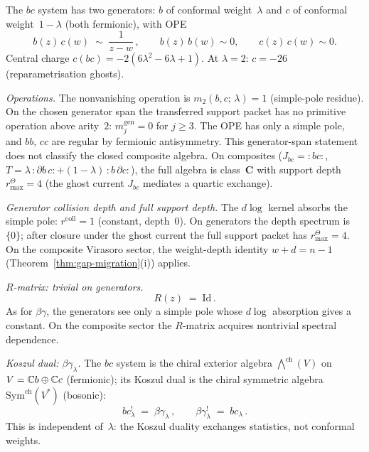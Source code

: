 \begin{computation}%
\label{comp:bc-ordered-bar}%
%
%
%
The $bc$ system has two generators: $b$ of conformal
weight~$\lambda$ and $c$ of conformal weight~$1-\lambda$
(both fermionic), with OPE
\begin{equation}\label{eq:bc-ope}
b(z)\,c(w)
\;\sim\;
\frac{1}{z-w}\,,
\qquad
b(z)\,b(w) \sim 0,
\qquad
c(z)\,c(w) \sim 0.
\end{equation}
Central charge $c(bc) = -2(6\lambda^2 - 6\lambda + 1)$.
At $\lambda = 2$: $c = -26$ (reparametrisation ghosts).

\smallskip
\noindent
\emph{Operations.}
The nonvanishing operation is
$m_2(b,c;\,\lambda) = 1$ (simple-pole residue).
On the chosen generator span the transferred support packet has no
primitive operation above arity~$2$:
$m^{\mathrm{gen}}_j=0$ for $j\ge3$. The OPE has only a simple pole,
and $bb$, $cc$ are regular by fermionic antisymmetry. This
generator-span statement does not classify the closed composite
algebra. On composites
($J_{bc} = {:}bc{:}$, $T = \lambda\,{:}\partial b\,c{:}
+ (1-\lambda)\,{:}b\,\partial c{:}$), the full algebra
is class~$\mathbf{C}$ with support depth $r^\Theta_{\max}=4$
(the ghost current $J_{bc}$ mediates a quartic exchange).

\smallskip
\noindent
\emph{Generator collision depth and full support depth.}
The $d\log$ kernel absorbs the simple pole:
$r^{\mathrm{coll}} = 1$ (constant, depth~$0$).
On generators the depth spectrum is $\{0\}$; after closure under the
ghost current the full support packet has
$r^\Theta_{\max}=4$. On the composite Virasoro sector, the
weight-depth identity $w + d = n - 1$
(Theorem~\ref{thm:gap-migration}(i)) applies.

\smallskip
\noindent
\emph{$R$-matrix: trivial on generators.}
\begin{equation}\label{eq:bc-R}
R(z) \;=\; \mathrm{Id}\,.
\end{equation}
As for $\beta\gamma$, the generators see only a simple pole
whose $d\log$ absorption gives a constant. On the composite
sector the $R$-matrix acquires nontrivial spectral
dependence.

\smallskip
\noindent
\emph{Koszul dual: $\beta\gamma_\lambda$.}
The $bc$ system is the chiral exterior algebra
$\bigwedge^{\mathrm{ch}}(V)$ on
$V = \mathbb{C} b \oplus \mathbb{C} c$ (fermionic); its Koszul dual is
the chiral symmetric algebra
$\mathrm{Sym}^{\mathrm{ch}}(V^*)$ (bosonic):
\begin{equation}\label{eq:bc-koszul-dual}
bc_\lambda^! \;=\; \beta\gamma_\lambda\,,
\qquad
\beta\gamma_\lambda^! \;=\; bc_\lambda\,.
\end{equation}
This is independent of~$\lambda$: the Koszul duality
exchanges statistics, not conformal weights.


\end{computation}
